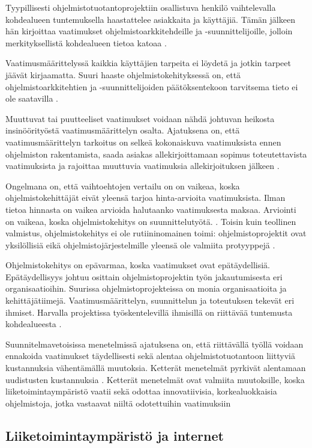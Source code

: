 \documentclass[finnish]{tktltiki2}
\theoremstyle{definition}
\theoremstyle{remark}
\begin{document}
Tyypillisesti ohjelmistotuotantoprojektiin osallistuva henkilö vaihtelevalla kohdealueen tuntemuksella haastattelee asiakkaita ja käyttäjiä. Tämän jälkeen hän kirjoittaa vaatimukset ohjelmistoarkkitehdeille ja -suunnittelijoille, jolloin merkityksellistä kohdealueen tietoa katoaa \cite{KES95}.

Vaatimusmäärittelyssä kaikkia käyttäjien tarpeita ei löydetä ja jotkin tarpeet jäävät kirjaamatta. Suuri haaste ohjelmistokehityksessä on, että ohjelmistoarkkitehtien ja -suunnittelijoiden päätöksentekoon tarvitsema tieto ei ole saatavilla \cite{KES95}.  

Muuttuvat tai puutteeliset vaatimukset voidaan nähdä johtuvan heikosta insinöörityöstä vaatimusmäärittelyn osalta. Ajatuksena on, että vaatimusmäärittelyn tarkoitus on selkeä kokonaiskuva vaatimuksista ennen ohjelmiston rakentamista, saada asiakas allekirjoittamaan sopimus toteutettavista vaatimuksista ja rajoittaa muuttuvia vaatimuksia allekirjoituksen jälkeen \cite{FOW01a}.

Ongelmana on, että vaihtoehtojen vertailu on on vaikeaa, koska ohjelmistokehittäjät eivät yleensä tarjoa hinta-arvioita vaatimuksista. Ilman tietoa hinnasta on vaikea arvioida halutaanko vaatimuksesta maksaa. Arviointi on vaikeaa, koska ohjelmistokehitys on suunnittelutyötä. \cite{FOW01a}. Toisin kuin teollinen valmistus, ohjelmistokehitys ei ole rutiininomainen toimi: ohjelmistoprojektit ovat yksilöllisiä eikä ohjelmistojärjestelmille yleensä ole valmiita protyyppejä \cite{KES95}.

Ohjelmistokehitys on epävarmaa, koska vaatimukset ovat epätäydellisiä. Epätäydellisyys johtuu osittain ohjelmistoprojektin työn jakautumisesta eri organisaatioihin.
Suurissa ohjelmistoprojekteissa on monia organisaatioita ja kehittäjätiimejä. Vaatimusmäärittelyn, suunnittelun ja toteutuksen tekevät eri ihmiset. Harvalla projektissa työskentelevillä ihmisillä on riittävää tuntemusta kohdealueesta \cite{KES95}.

Suunnitelmavetoisissa menetelmissä ajatuksena on, että riittävällä työllä voidaan ennakoida vaatimukset täydellisesti sekä alentaa ohjelmistotuotantoon liittyviä kustannuksia vähentämällä muutoksia. Ketterät menetelmät pyrkivät alentamaan uudistusten kustannuksia \cite{WIC03}. Ketterät menetelmät ovat valmiita muutoksille, koska liiketoimintaympäristö vaatii sekä odottaa innovatiivisia, korkealuokkaisia ohjelmistoja, jotka vastaavat niiltä odotettuihin vaatimuksiin \cite{BRL03}

\subsection{Liiketoimintaympäristö ja internet}
\end{document}
